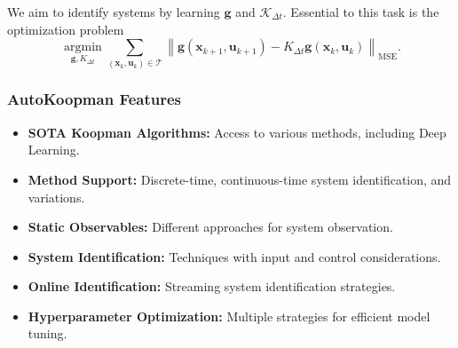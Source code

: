 \documentclass[shortpres,aspectratio=43]{beamer}
\begin{document}
\begin{frame}
\begin{adjustbox}{max totalsize={.65\textwidth}{.65\textheight},center}
\end{adjustbox}

\pause
We aim to identify systems by learning $\mathbf g$ and $\mathcal K_{\Delta t}$. Essential to this task is the optimization problem
\begin{equation}
    \underset{\mathbf{g}, K_{\Delta t}}{\operatorname{argmin}} \sum_{\left(\mathbf{x}_k, \mathbf{u}_k\right) \in \mathcal{T}}\left\|\mathbf{g}\left(\mathbf{x}_{k+1}, \mathbf{u}_{k+1}\right)-K_{\Delta t} \mathbf{g}\left(\mathbf{x}_k, \mathbf{u}_k\right)\right\|_{\mathrm{MSE}}.
\end{equation}
\end{frame}

\begin{frame}
\frametitle{AutoKoopman Features}
\begin{itemize}
    \item<1-> \textbf{SOTA Koopman Algorithms:} Access to various methods, including Deep Learning.
    \item<2-> \textbf{Method Support:} Discrete-time, continuous-time system identification, and variations.
    \item<3-> \textbf{Static Observables:} Different approaches for system observation.
    \item<4-> \textbf{System Identification:} Techniques with input and control considerations.
    \item<5-> \textbf{Online Identification:} Streaming system identification strategies.
    \item<6-> \textbf{Hyperparameter Optimization:} Multiple strategies for efficient model tuning.
\end{itemize}
\end{frame}
\end{document}
